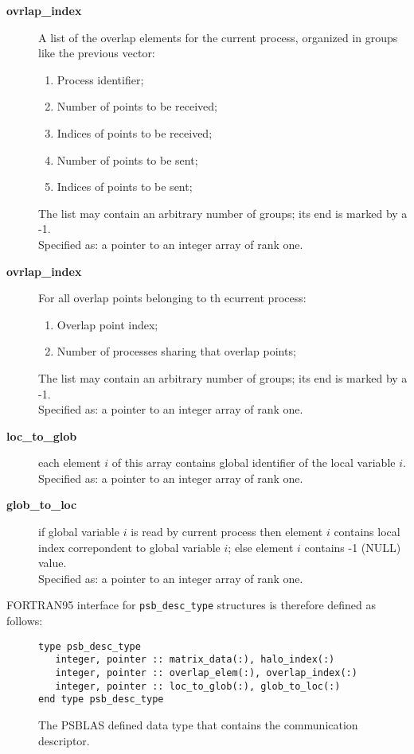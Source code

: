 \begin{description}
\item [{\bf ovrlap\_index}] A list of the overlap elements for the
current process, organized in groups like the previous vector:
\begin{enumerate}
\item Process identifier;
\item Number of points to be received;
\item Indices of points to be received;
\item Number of points to be sent;
\item Indices of points to be sent;
\end{enumerate}
The list may contain an arbitrary number of groups; its end is marked
by a -1.\\
Specified as: a pointer to an integer array  of rank one.
\item [{\bf ovrlap\_index}] For all overlap points belonging to th
ecurrent process:
\begin{enumerate}
\item  Overlap point index;
\item  Number of processes sharing that overlap points;
\end{enumerate}
The list may contain an arbitrary number of groups; its end is marked
by a -1.\\
Specified as: a pointer to an integer array of rank one.
\item[{\bf loc\_to\_glob}] each element $i$ of this array contains
global identifier of the local variable $i$.\\
Specified as: a pointer to an integer array of rank one.
\item[{\bf glob\_to\_loc}]  if global variable $i$ is read by current
process then element $i$ contains local index correpondent to global variable $i$;
else element $i$ contains -1 (NULL) value.\\
Specified as: a pointer to an integer array of rank one.
\end{description}
FORTRAN95 interface for \verb|psb_desc_type| structures is therefore defined
as follows:
\begin{figure}[h!]
  \begin{Sbox}
    \begin{minipage}[tl]{0.9\textwidth}
\begin{verbatim} 
type psb_desc_type 
   integer, pointer :: matrix_data(:), halo_index(:)
   integer, pointer :: overlap_elem(:), overlap_index(:)
   integer, pointer :: loc_to_glob(:), glob_to_loc(:)
end type psb_desc_type 
\end{verbatim}
    \end{minipage}
  \end{Sbox}
  \setlength{\fboxsep}{8pt}
  \begin{center}
    \fbox{\TheSbox}
  \end{center}
  \caption{\label{fig:desctype}The PSBLAS defined data type that
    contains the communication descriptor.}
\end{figure}

